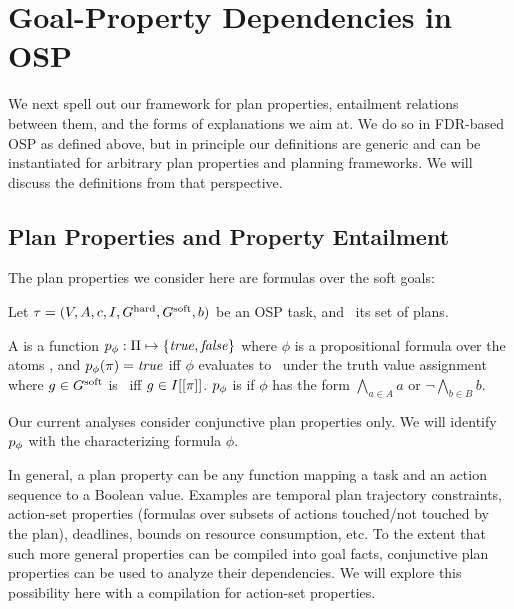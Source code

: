 \section{Goal-Property Dependencies in OSP}
\label{framework}



We next spell out our framework for plan properties, entailment
relations between them, and the forms of explanations we aim at. We do
so in FDR-based OSP as defined above, but in principle our definitions
are generic and can be instantiated for arbitrary plan properties and
planning frameworks. We will discuss the definitions from that
perspective.



\subsection{Plan Properties and Property Entailment}

The plan properties we consider here are formulas over the soft goals:

\begin{definition}
\label{def:osp-plan-properties}
Let $\tau =
(V,\allowbreak A,\allowbreak{\ensuremath{c}},\allowbreak I,\allowbreak G^{\text{\textup{hard}}},\allowbreak G^{\text{\textup{soft}}},\allowbreak{\ensuremath{b}})$
be an OSP task, and \plans\ its set of plans.

A  is a function $p_\phi : \Pi \mapsto
\{\mathit{true}, \mathit{false}\}$ where $\phi$ is a propositional formula over the
atoms \goalsoft, and $p_\phi(\pi) = \mathit{true}$ iff $\phi$ evaluates
to \true\ under the truth value assignment where $g \in G^{\text{\textup{soft}}}$ is
\true\ iff $g \in I[[\pi]]$.
%
$p_\phi$ is  if $\phi$ has the form
$\bigwedge_{a \in A} a\allowbreak$ or $\neg \bigwedge_{b \in B} b$.
\end{definition}

Our current analyses consider conjunctive plan properties only. We
will identify $p_\phi$ with the characterizing formula $\phi$.

In general, a plan property can be any function mapping a task and an
action sequence to a Boolean value. Examples are temporal plan
trajectory constraints, action-set properties (formulas over subsets
of actions touched/not touched by the plan), deadlines, bounds on
resource consumption, etc. To the extent that such more general
properties can be compiled into goal facts, conjunctive plan
properties can be used to analyze their dependencies. We will explore
this possibility here with a compilation for action-set properties.

